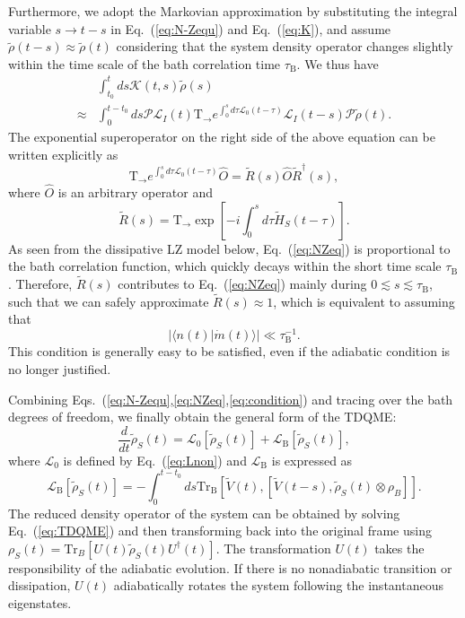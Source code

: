 \documentclass[english,nofootinbib, pra, twocolumn,superscriptaddress]{revtex4-1}
\begin{document}
Furthermore, we adopt the Markovian approximation by substituting the integral
variable $s\rightarrow t-s$ in Eq.~(\ref{eq:N-Zequ}) and Eq.~(\ref{eq:K}),
and assume $\tilde{\rho}(t-s)\approx\tilde{\rho}(t)$ considering
that the system density operator changes slightly within the time
scale of the bath correlation time $\tau_{\text{B}}$. We thus have
\begin{align}
 & \int_{t_{0}}^{t}ds\mathcal{K}(t,s)\tilde{\rho}(s)\nonumber \\
\approx & \int_{0}^{t-t_{0}}ds\mathcal{P}\mathcal{L}_{I}(t)\mbox{T}_{\rightarrow}e^{\int_{0}^{s}d\tau\mathcal{L}_{\text{0}}(t-\tau)}\mathcal{L}_{I}(t-s)\mathcal{P}\tilde{\rho}(t).\label{eq:NZeq}
\end{align}
The exponential superoperator on the right side of the above equation
can be written explicitly as
\begin{equation}
\mbox{T}_{\rightarrow}e^{\int_{0}^{s}d\tau\mathcal{L}_{\text{0}}(t-\tau)}\hat{O}=\tilde{R}(s)\hat{O}\tilde{R}^{\dagger}(s),
\end{equation}
where $\hat{O}$ is an arbitrary operator and 
\begin{equation}
\tilde{R}(s)=\mbox{T}_{\rightarrow}\exp[-i\int_{0}^{s}d\tau\tilde{H}_{S}(t-\tau)].
\end{equation}
As seen from the dissipative LZ model below, Eq.~(\ref{eq:NZeq}) is proportional to
the bath correlation function, which quickly decays within the short
time scale $\tau_{\text{B}}$. Therefore,
$\tilde{R}(s)$ contributes to Eq.~(\ref{eq:NZeq}) mainly during
$0\lesssim s\lesssim\tau_{\text{B}}$, such that we can safely approximate
$\tilde{R}(s)\approx1$, which is equivalent to assuming that
\begin{equation}
\vert\langle n(t)\vert\dot{m}(t)\rangle\vert\ll\tau_{\text{B}}^{-1}.\label{eq:condition}
\end{equation}
This condition is generally easy to be satisfied, even if the adiabatic condition
\citep{1973.Messiah} is no longer justified. 

Combining Eqs.~(\ref{eq:N-Zequ},\ref{eq:NZeq},\ref{eq:condition})
and tracing over the bath degrees of freedom, we finally obtain the
general form of the TDQME: 
\begin{equation}
\frac{d}{dt}\tilde{\rho}_{S}(t)=\mathcal{L}_{\text{0}}[\tilde{\rho}_{S}(t)]+\mathcal{L}_{\text{B}}[\tilde{\rho}_{S}(t)],\label{eq:TDQME}
\end{equation}
where $\mathcal{L}_{\text{0}}$ is defined by Eq.~(\ref{eq:Lnon})
and $\mathcal{L}_{\text{B}}$ is expressed as
\begin{equation}
\mathcal{L}_{\text{B}}[\tilde{\rho}_{S}(t)]=-\int_{0}^{t-t_{0}}ds\textrm{Tr}_{\text{B}}[\tilde{V}(t),[\tilde{V}(t-s),\tilde{\rho}_{S}(t)\otimes\rho_{B}]].\label{eq:LB}
\end{equation}
The reduced density operator of the system can be obtained by solving
Eq.~(\ref{eq:TDQME}) and then transforming back into the original frame
using $\rho_{S}(t)=\text{Tr}_{B}[U(t)\tilde{\rho}_{S}(t)U^{\dagger}(t)]$.
The transformation $U(t)$ takes the responsibility of the adiabatic evolution.
If there is no nonadiabatic transition or dissipation, $U(t)$ adiabatically rotates the system following the instantaneous eigenstates.
\end{document}
